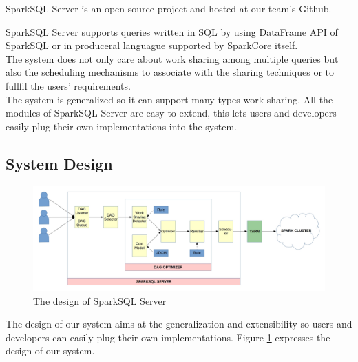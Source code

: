 SparkSQL Server is an open source project and hosted at our team's Github.

SparkSQL Server supports queries written in SQL by using DataFrame API of SparkSQL or in produceral languague supported by SparkCore itself.\\

The system does not only care about work sharing among multiple queries but also the scheduling mechanisms to associate with the sharing techniques or to fullfil the users' requirements.\\

The system is generalized so it can support many types work sharing. All the modules of SparkSQL Server are easy to extend, this lets users and developers easily plug their own implementations into the system.\\

\subsection{System Design}
\begin{figure}
\includegraphics[width=\textwidth]{Figures/sparksql-server-design.jpg}
\caption{The design of SparkSQL Server}
\label{fig:sparksql-design}
\end{figure}
The design of our system aims at the generalization and extensibility so users and developers can easily plug their own implementations. Figure \ref{fig:sparksql-design} expresses the design of our system.\\

